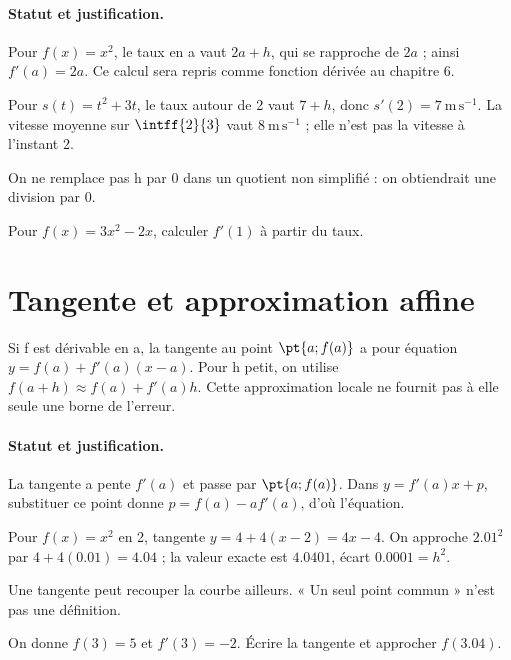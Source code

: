 \paragraph{Statut et justification.} Pour $f(x)=x^2$, le taux en a vaut $2a+h$, qui se rapproche de $2a$ ; ainsi $f\prime(a)=2a$. Ce calcul sera repris comme fonction dérivée au chapitre 6.
\begin{example}Pour $s(t)=t^2+3t$, le taux autour de 2 vaut $7+h$, donc $s\prime(2)=7\ \mathrm{m\,s^{-1}}$. La vitesse moyenne sur $\intff{2}{3}$ vaut $8\ \mathrm{m\,s^{-1}}$ ; elle n’est pas la vitesse à l’instant 2.\end{example}\label{C04-EX2}
\begin{pitfall}On ne remplace pas h par 0 dans un quotient non simplifié : on obtiendrait une division par 0.\end{pitfall}
\begin{application}Pour $f(x)=3x^2-2x$, calculer $f\prime(1)$ à partir du taux.\end{application}\label{C04-AP2}
\section{Tangente et approximation affine}\label{C04-U3}
\begin{keypoint}
Si f est dérivable en a, la tangente au point $\pt{a;f(a)}$ a pour équation $y=f(a)+f\prime(a)(x-a)$. Pour h petit, on utilise $f(a+h)\approx f(a)+f\prime(a)h$. Cette approximation locale ne fournit pas à elle seule une borne de l’erreur.
\end{keypoint}
\paragraph{Statut et justification.} La tangente a pente $f\prime(a)$ et passe par $\pt{a;f(a)}$. Dans $y=f\prime(a)x+p$, substituer ce point donne $p=f(a)-af\prime(a)$, d’où l’équation.
\begin{example}Pour $f(x)=x^2$ en 2, tangente $y=4+4(x-2)=4x-4$. On approche $\num{2,01}^2$ par $4+4(\num{0,01})=\num{4,04}$ ; la valeur exacte est $\num{4,0401}$, écart $\num{0,0001}=h^2$.\end{example}\label{C04-EX3}
\begin{pitfall}Une tangente peut recouper la courbe ailleurs. « Un seul point commun » n’est pas une définition.\end{pitfall}
\begin{application}On donne $f(3)=5$ et $f\prime(3)=-2$. Écrire la tangente et approcher $f(\num{3,04})$.\end{application}\label{C04-AP3}
